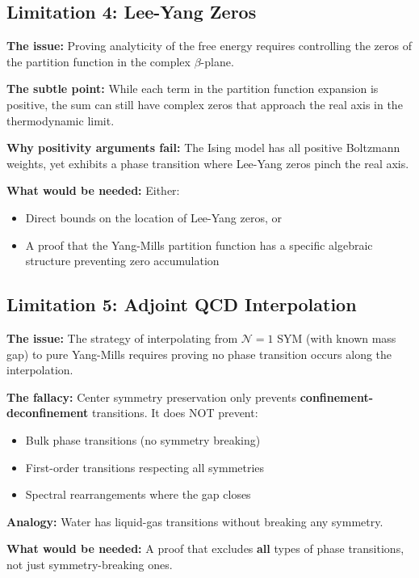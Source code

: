 \subsection{Limitation 4: Lee-Yang Zeros}

\textbf{The issue:} Proving analyticity of the free energy requires controlling the zeros of the partition function in the complex $\beta$-plane.

\textbf{The subtle point:} While each term in the partition function expansion is positive, the sum can still have complex zeros that approach the real axis in the thermodynamic limit.

\textbf{Why positivity arguments fail:} The Ising model has all positive Boltzmann weights, yet exhibits a phase transition where Lee-Yang zeros pinch the real axis.

\textbf{What would be needed:} Either:
\begin{itemize}
    \item Direct bounds on the location of Lee-Yang zeros, or
    \item A proof that the Yang-Mills partition function has a specific algebraic structure preventing zero accumulation
\end{itemize}

\subsection{Limitation 5: Adjoint QCD Interpolation}

\textbf{The issue:} The strategy of interpolating from $\mathcal{N}=1$ SYM (with known mass gap) to pure Yang-Mills requires proving no phase transition occurs along the interpolation.

\textbf{The fallacy:} Center symmetry preservation only prevents \textbf{confinement-deconfinement} transitions. It does NOT prevent:
\begin{itemize}
    \item Bulk phase transitions (no symmetry breaking)
    \item First-order transitions respecting all symmetries
    \item Spectral rearrangements where the gap closes
\end{itemize}

\textbf{Analogy:} Water has liquid-gas transitions without breaking any symmetry.

\textbf{What would be needed:} A proof that excludes \textbf{all} types of phase transitions, not just symmetry-breaking ones.

